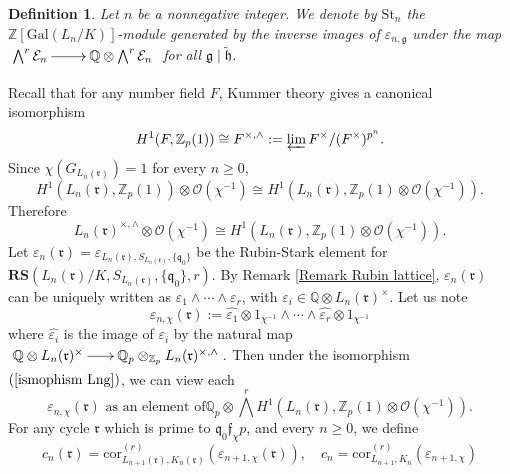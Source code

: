 \documentclass[reqno]{amsart}
\newcounter{dummy} \numberwithin{dummy}{section}
\newtheorem{deft}[dummy]{Definition}
\begin{document}
\begin{deft}\label{Definition of Rubin Strak module}
Let $n$ be a nonnegative integer. We denote by $\mathrm{St}_{n}$ the
$\mathbb{Z}[\mathrm{Gal}(L_{n}/K)]$-module generated by the inverse
images of $\varepsilon_{n,\mathfrak{g}}$ under the map $
\xymatrix@=2pc{ \bigwedge^{r}\mathcal{E}_{n}\ar[r]&
 \mathbb{Q}\otimes\bigwedge^{r}\mathcal{E}_{n}}$
 for all $\mathfrak{g}\mid \widetilde{\mathfrak{h}}$.
\end{deft}\vskip 7pt
Recall that for any number field $F$, Kummer theory gives a
canonical isomorphism
$$
H^{1}(F,\mathbb{Z}_{p}(1))\cong F^{\times,\wedge}:=\varprojlim
F^{\times}/(F^{\times})^{p^{n}}.
$$
Since  $\chi(G_{L_{n}(\mathfrak{r})})=1$ for every $n\geq0$,
$$
H^{1}(L_{n}(\mathfrak{r}),\mathbb{Z}_{p}(1))\otimes
\mathcal{O}(\chi^{-1})\cong
H^{1}(L_{n}(\mathfrak{r}),\mathbb{Z}_{p}(1)\otimes\mathcal{O}(\chi^{-1})).
$$
 Therefore
 \begin{equation}\label{ismophism Lng}
L_{n}(\mathfrak{r})^{\times,\wedge}\otimes
\mathcal{O}(\chi^{-1})\cong
H^{1}(L_{n}(\mathfrak{r}),\mathbb{Z}_{p}(1)\otimes\mathcal{O}(\chi^{-1})).
 \end{equation}
 Let $\varepsilon_{n}(\mathfrak{r})=
 \varepsilon_{L_{n}(\mathfrak{r}),S_{L_{n}(\mathfrak{r})}, \{\mathfrak{q}_{0}\}}$ be the Rubin-Stark
element for
$\mathbf{RS}(L_{n}(\mathfrak{r})/K,S_{L_{n}(\mathfrak{r})},\{\mathfrak{q}_{0}\},r)$.
By Remark \ref{Remark Rubin lattice},
$\varepsilon_{n}(\mathfrak{r})$ can be uniquely written as
$\varepsilon_{1}\wedge\cdots\wedge \varepsilon_{r}$, with
$\varepsilon_{i}\in \mathbb{Q}\otimes L_{n}(\mathfrak{r})^{\times}$.
 Let us note
\begin{equation}\label{definition of chi element of p copletion}
\varepsilon_{n,\chi}(\mathfrak{r}):=\widehat{\varepsilon_{1}}\otimes1_{\chi^{-1}}\wedge\cdots\wedge
\widehat{\varepsilon_{r}}\otimes 1_{\chi^{-1}}
\end{equation}
where $\widehat{\varepsilon_{i}}$ is the image of $\varepsilon_{i}$
by the natural map $ \xymatrix@=1.5pc{ \mathbb{Q}\otimes
L_{n}(\mathfrak{r})^{\times}\ar[r]&
\mathbb{Q}_{p}\otimes_{\mathbb{Z}_{p}} L_{n}(\mathfrak{r})^{\times,
\wedge}}.$
 Then under the isomorphism $(\ref{ismophism Lng})$, we can
view each
$$
\mbox{ $\varepsilon_{n,\chi}(\mathfrak{r})$ as an element of
$\mathbb{Q}_{p}\otimes\bigwedge^{r}H^{1}(L_{n}
(\mathfrak{r}),\mathbb{Z}_{p}(1)\otimes\mathcal{O}(\chi^{-1})).$ }
$$
For any cycle $\mathfrak{r}$ which is prime to
$\mathfrak{q}_{0}\mathfrak{f}_{\chi}p$, and every $n\geq 0$, we
define
\begin{equation}\label{definition of Engr}
c_{n}(\mathfrak{r})=
  \mathrm{cor}_{L_{n+1}(\mathfrak{r}),K_{n}(\mathfrak{r})}^{(r)}
(\varepsilon_{n+1,\chi}(\mathfrak{r})),\quad c_{n}=
  \mathrm{cor}_{L_{n+1},K_{n}}^{(r)}
(\varepsilon_{n+1,\chi})
\end{equation}
\end{document}
